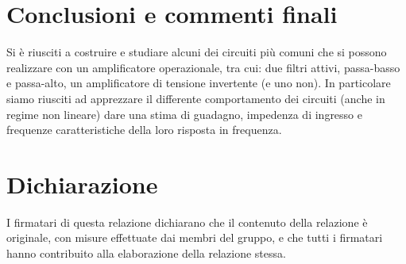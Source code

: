 \documentclass[10pt,a4paper]{article}
\begin{document}
\section*{Conclusioni e commenti finali}
Si è riusciti a costruire e studiare alcuni dei circuiti più comuni che si
possono realizzare con un amplificatore operazionale, tra cui: due filtri
attivi, passa-basso e passa-alto, un amplificatore di tensione invertente
(e uno non).
In particolare siamo riusciti ad apprezzare il differente comportamento dei
circuiti (anche in regime non lineare) dare una stima di guadagno, impedenza di
ingresso e frequenze caratteristiche della loro risposta in frequenza.

\section*{Dichiarazione}
I firmatari di questa relazione dichiarano che il contenuto della relazione \`e
originale, con misure effettuate dai membri del gruppo, e che tutti i firmatari
hanno contribuito alla elaborazione della relazione stessa.
\end{document}
